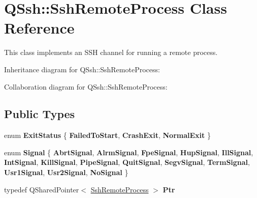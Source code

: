 \hypertarget{class_q_ssh_1_1_ssh_remote_process}{}\section{Q\+Ssh\+:\+:Ssh\+Remote\+Process Class Reference}
\label{class_q_ssh_1_1_ssh_remote_process}


This class implements an S\+SH channel for running a remote process.  




Inheritance diagram for Q\+Ssh\+:\+:Ssh\+Remote\+Process\+:


Collaboration diagram for Q\+Ssh\+:\+:Ssh\+Remote\+Process\+:
\subsection*{Public Types}
\begin{DoxyCompactItemize}
\item 
\mbox{\label{class_q_ssh_1_1_ssh_remote_process_a283c9e1092b126a9ab245c343d52b3cb}} 
enum {\bfseries Exit\+Status} \{ {\bfseries Failed\+To\+Start}, 
{\bfseries Crash\+Exit}, 
{\bfseries Normal\+Exit}
 \}
\item 
\mbox{\label{class_q_ssh_1_1_ssh_remote_process_af8d554aff0a20c859cd652ce682169ec}} 
enum {\bfseries Signal} \{ \newline
{\bfseries Abrt\+Signal}, 
{\bfseries Alrm\+Signal}, 
{\bfseries Fpe\+Signal}, 
{\bfseries Hup\+Signal}, 
\newline
{\bfseries Ill\+Signal}, 
{\bfseries Int\+Signal}, 
{\bfseries Kill\+Signal}, 
{\bfseries Pipe\+Signal}, 
\newline
{\bfseries Quit\+Signal}, 
{\bfseries Segv\+Signal}, 
{\bfseries Term\+Signal}, 
{\bfseries Usr1\+Signal}, 
\newline
{\bfseries Usr2\+Signal}, 
{\bfseries No\+Signal}
 \}
\item 
\mbox{\label{class_q_ssh_1_1_ssh_remote_process_acdca6610660a5424fcf6832b7259761a}} 
typedef Q\+Shared\+Pointer$<$ \mbox{\hyperlink{class_q_ssh_1_1_ssh_remote_process}{Ssh\+Remote\+Process}} $>$ {\bfseries Ptr}
\end{DoxyCompactItemize}

